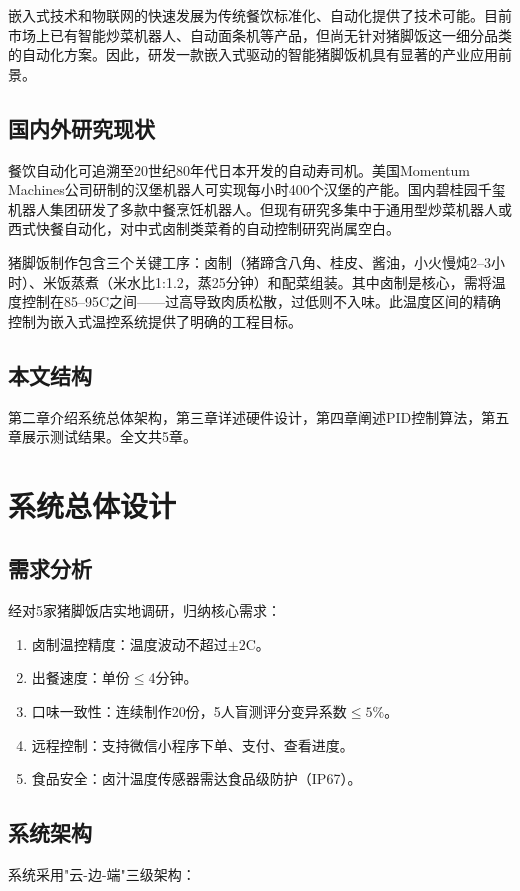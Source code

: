 \documentclass{gdut-thesis}
\begin{document}
嵌入式技术和物联网的快速发展为传统餐饮标准化、自动化提供了技术可能。目前市场上已有智能炒菜机器人、自动面条机等产品，但尚无针对猪脚饭这一细分品类的自动化方案。因此，研发一款嵌入式驱动的智能猪脚饭机具有显著的产业应用前景。

\section{国内外研究现状}
餐饮自动化可追溯至20世纪80年代日本开发的自动寿司机。美国Momentum Machines公司研制的汉堡机器人可实现每小时400个汉堡的产能。国内碧桂园千玺机器人集团研发了多款中餐烹饪机器人。但现有研究多集中于通用型炒菜机器人或西式快餐自动化，对中式卤制类菜肴的自动控制研究尚属空白。

猪脚饭制作包含三个关键工序：卤制（猪蹄含八角、桂皮、酱油，小火慢炖2--3小时）、米饭蒸煮（米水比1:1.2，蒸25分钟）和配菜组装。其中卤制是核心，需将温度控制在85--95\textdegree C之间——过高导致肉质松散，过低则不入味。此温度区间的精确控制为嵌入式温控系统提供了明确的工程目标。

\section{本文结构}
第二章介绍系统总体架构，第三章详述硬件设计，第四章阐述PID控制算法，第五章展示测试结果。全文共5章。

\chapter{系统总体设计}

\section{需求分析}
经对5家猪脚饭店实地调研，归纳核心需求：

\begin{enumerate}[label=（\arabic*）]
    \item 卤制温控精度：温度波动不超过$\pm 2$\textdegree C。
    \item 出餐速度：单份$\leq$4分钟。
    \item 口味一致性：连续制作20份，5人盲测评分变异系数$\leq 5\%$。
    \item 远程控制：支持微信小程序下单、支付、查看进度。
    \item 食品安全：卤汁温度传感器需达食品级防护（IP67）。
\end{enumerate}

\section{系统架构}
系统采用"云-边-端"三级架构：
\end{document}
